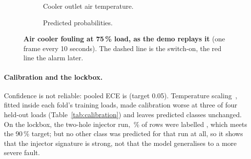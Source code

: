 \documentclass[10pt]{article}
\begin{document}
\begin{figure}[!htbp]
\centering
\begin{subfigure}[t]{0.49\textwidth}
\caption{Cooler outlet air temperature.}
\end{subfigure}\hfill
\begin{subfigure}[t]{0.49\textwidth}
\caption{Predicted probabilities.}
\end{subfigure}
\caption{\textbf{Air cooler fouling at 75\,\% load, as the demo replays it} (one frame every 10 seconds). The dashed line is the switch-on, the red line the alarm \ReplayDelay{} later.}
\label{fig:replay}
\end{figure}

\paragraph{Calibration and the lockbox.} Confidence is not reliable: pooled ECE is \CalEce{} (target 0.05). Temperature scaling~\cite{guo2017calibration}, fitted inside each fold's training loads, made calibration worse at three of four held-out loads (Table~\ref{tab:calibration}) and leaves predicted classes unchanged. On the lockbox, the two-hole injector run, \LockShare\,\% of rows were labelled \LockLabel, which meets the 90\,\% target; but no other class was predicted for that run at all, so it shows that the injector signature is strong, not that the model generalises to a more severe fault.
\end{document}
